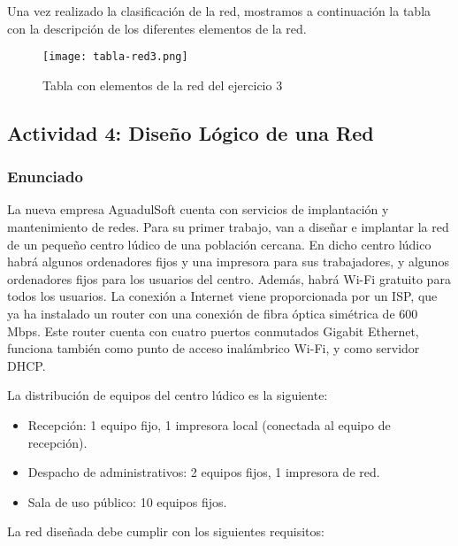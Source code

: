 Una vez realizado la clasificación de  la red, mostramos a continuación la tabla con la descripción de los diferentes elementos de la red.

\begin{figure}[H]
    \centering
    \texttt{[image: tabla-red3.png]}
    \caption{Tabla con elementos de la red del ejercicio 3}
\end{figure}

\subsection{Actividad 4: Diseño Lógico de una Red}

\subsubsection{Enunciado}
La nueva empresa AguadulSoft cuenta con servicios de implantación y mantenimiento de redes. Para su primer trabajo, van a diseñar e implantar la red de un pequeño centro lúdico de una población cercana. En dicho centro lúdico habrá algunos ordenadores fijos y una impresora para sus trabajadores, y algunos ordenadores fijos para los usuarios del centro. Además, habrá Wi-Fi gratuito para todos los usuarios. La conexión a Internet viene proporcionada por un ISP, que ya ha instalado un router con una conexión de fibra óptica simétrica de 600 Mbps. Este router cuenta con cuatro puertos conmutados Gigabit Ethernet, funciona también como punto de acceso inalámbrico Wi-Fi, y como servidor DHCP.

La distribución de equipos del centro lúdico es la siguiente:

\begin{itemize}
    \item Recepción: 1 equipo fijo, 1 impresora local (conectada al equipo de recepción).
    \item Despacho de administrativos: 2 equipos fijos, 1 impresora de red.
    \item Sala de uso público: 10 equipos fijos.
\end{itemize}

La red diseñada debe cumplir con los siguientes requisitos:

